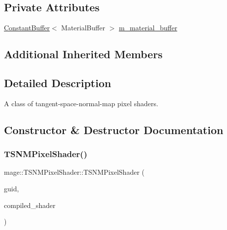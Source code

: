 \subsection*{Private Attributes}
\begin{DoxyCompactItemize}
\item 
\hyperlink{structmage_1_1_constant_buffer}{Constant\+Buffer}$<$ Material\+Buffer $>$ \hyperlink{classmage_1_1_t_s_n_m_pixel_shader_a44a37625ffb8de2ace98b9457972e030}{m\+\_\+material\+\_\+buffer}
\end{DoxyCompactItemize}
\subsection*{Additional Inherited Members}


\subsection{Detailed Description}
A class of tangent-\/space-\/normal-\/map pixel shaders. 

\subsection{Constructor \& Destructor Documentation}
\hypertarget{classmage_1_1_t_s_n_m_pixel_shader_a50c306fae3715ba9b15078b662e2b6d0}{}\label{classmage_1_1_t_s_n_m_pixel_shader_a50c306fae3715ba9b15078b662e2b6d0} 
\subsubsection{\texorpdfstring{T\+S\+N\+M\+Pixel\+Shader()}{TSNMPixelShader()}\hspace{0.1cm}{\footnotesize\ttfamily [1/4]}}
{\footnotesize\ttfamily mage\+::\+T\+S\+N\+M\+Pixel\+Shader\+::\+T\+S\+N\+M\+Pixel\+Shader (\begin{DoxyParamCaption}\item[{const wstring \&}]{guid,  }\item[{const \hyperlink{structmage_1_1_compiled_shader}{Compiled\+Shader} $\ast$}]{compiled\+\_\+shader }\end{DoxyParamCaption})\hspace{0.3cm}{\ttfamily [explicit]}}

